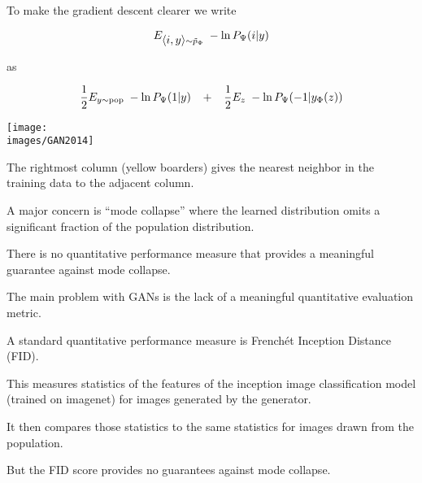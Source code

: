{

To make the gradient descent clearer we write

\vfill
$$E_{{\mbox{$\langle i,y\rangle$}} \sim \tilde{p}_\Phi}\;-\ln P_\Psi(i|y)$$

\vfill
as

\vfill
$$\frac{1}{2} E_{y \sim \mathrm{pop}}\;-\ln P_\Psi(1|y) \;\;\;+\;\;\; \frac{1}{2} E_z\;-\ln P_\Psi(-1|y_\Phi(z))$$

\centerline{\texttt{[image: \\images/GAN2014]}}
The rightmost column (yellow boarders) gives the nearest neighbor in the training data to the adjacent column.


A major concern is ``mode collapse'' where the learned distribution omits a significant fraction of the population distribution.

\vfill
There is no quantitative performance measure that provides a meaningful guarantee against mode collapse.


The main problem with GANs is the lack of a meaningful quantitative evaluation metric.

\vfill
A standard quantitative performance measure is French\'{e}t Inception Distance (FID).

\vfill
This measures statistics of the features
of the inception image classification model (trained on imagenet) for images generated by the generator.

\vfill
It then compares those statistics
to the same statistics for images drawn from the population.

\vfill
But the FID score provides no guarantees against mode collapse.


}

